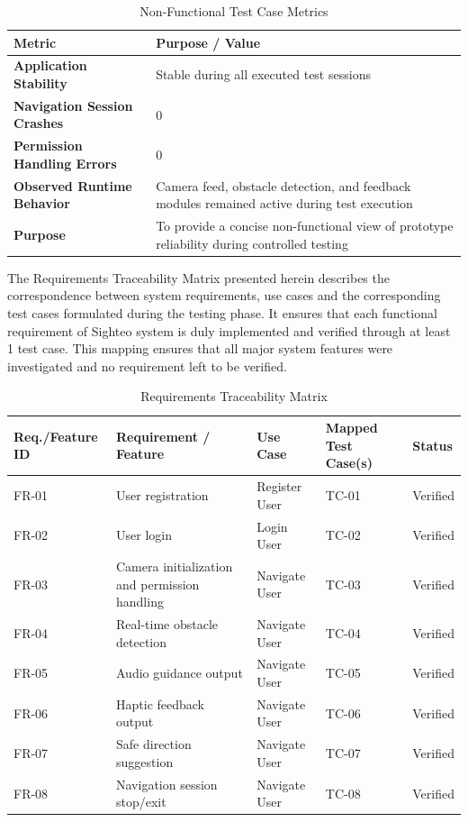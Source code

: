 \documentclass{FastFyp}
\begin{document}
\begin{table}[!ht]
\centering
\caption{Non-Functional Test Case Metrics}
\small
\begin{tabular}{|p{5.5cm}|p{8.5cm}|}
\hline
\textbf{Metric} & \textbf{Purpose / Value} \\ \hline
\textbf{Application Stability} & Stable during all executed test sessions \\ \hline
\textbf{Navigation Session Crashes} & 0 \\ \hline
\textbf{Permission Handling Errors} & 0 \\ \hline
\textbf{Observed Runtime Behavior} & Camera feed, obstacle detection, and feedback modules remained active during test execution \\ \hline
\textbf{Purpose} & To provide a concise non-functional view of prototype reliability during controlled testing \\ \hline
\end{tabular}
\label{tab:stability_metrics}
\end{table}

The Requirements Traceability Matrix presented herein describes the correspondence between system requirements, use cases and the corresponding test cases formulated during the testing phase. It ensures that each functional requirement of Sighteo system is duly implemented and verified through at least 1 test case. This mapping ensures that all major system features were investigated and no requirement left to be verified.

\begin{table}[!ht]
\centering
\caption{Requirements Traceability Matrix}
\small
\begin{tabular}{|p{2.2cm}|p{3.2cm}|p{2.5cm}|p{3.5cm}|p{1.8cm}|}
\hline
\textbf{Req./Feature ID} & \textbf{Requirement / Feature} & \textbf{Use Case} & \textbf{Mapped Test Case(s)} & \textbf{Status} \\ \hline
FR-01 & User registration & Register User & TC-01 & Verified \\ \hline
FR-02 & User login & Login User & TC-02 & Verified \\ \hline
FR-03 & Camera initialization and permission handling & Navigate User & TC-03 & Verified \\ \hline
FR-04 & Real-time obstacle detection & Navigate User & TC-04 & Verified \\ \hline
FR-05 & Audio guidance output & Navigate User & TC-05 & Verified \\ \hline
FR-06 & Haptic feedback output & Navigate User & TC-06 & Verified \\ \hline
FR-07 & Safe direction suggestion & Navigate User & TC-07 & Verified \\ \hline
FR-08 & Navigation session stop/exit & Navigate User & TC-08 & Verified \\ \hline
\end{tabular}
\label{tab:traceability}
\end{table}
\pagebreak
\end{document}
